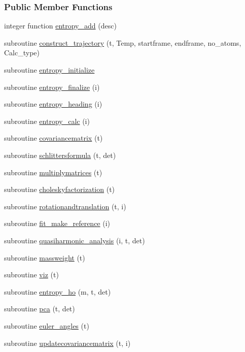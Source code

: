 \subsubsection*{Public Member Functions}
\begin{DoxyCompactItemize}
\item 
integer function \hyperlink{classcalc__entropy_aed82d686b07a9020efcd8f4587376359}{entropy\-\_\-add} (desc)
\item 
subroutine \hyperlink{classcalc__entropy_a2706ab3575d4580b597c79e13eb3bb5d}{construct\-\_\-trajectory} (t, Temp, startframe, endframe, no\-\_\-atoms, Calc\-\_\-type)
\item 
subroutine \hyperlink{classcalc__entropy_a9d1d1405c17e8adf37d4832bc14142c5}{entropy\-\_\-initialize}
\item 
subroutine \hyperlink{classcalc__entropy_a8b7097d5478f130ec2b04ac4eb69e156}{entropy\-\_\-finalize} (i)
\item 
subroutine \hyperlink{classcalc__entropy_a45c5006942f4bd7795537dcafd948a49}{entropy\-\_\-heading} (i)
\item 
subroutine \hyperlink{classcalc__entropy_aa0d5bd96bcbb6587c5e1e624674e5e4e}{entropy\-\_\-calc} (i)
\item 
subroutine \hyperlink{classcalc__entropy_a3755d627dc2eefc79df4b59a4250ed9a}{covariancematrix} (t)
\item 
subroutine \hyperlink{classcalc__entropy_aa6f0af095a3daa755f27611c7ee3a137}{schlittersformula} (t, det)
\item 
subroutine \hyperlink{classcalc__entropy_a1bf295689ab7aa8ba66f5d835758c3ca}{multiplymatrices} (t)
\item 
subroutine \hyperlink{classcalc__entropy_ab9136e2396446b5059a5fe7d36125573}{choleskyfactorization} (t)
\item 
subroutine \hyperlink{classcalc__entropy_ac138d87a9a4edec83f075e4ae4525ef6}{rotationandtranslation} (t, i)
\item 
subroutine \hyperlink{classcalc__entropy_a874a920bba323f41659a5a5b14988c01}{fit\-\_\-make\-\_\-reference} (i)
\item 
subroutine \hyperlink{classcalc__entropy_a2a9d851b8b3e7af4603059175dc539e3}{quasiharmonic\-\_\-analysis} (i, t, det)
\item 
subroutine \hyperlink{classcalc__entropy_aaf7cfa4698786aa90ec49a0534983b2c}{massweight} (t)
\item 
subroutine \hyperlink{classcalc__entropy_ab1305be69ef87d449d6e0a83f557ef80}{viz} (t)
\item 
subroutine \hyperlink{classcalc__entropy_ab614cb6e56be859a584badf06fdbc1fa}{entropy\-\_\-ho} (m, t, det)
\item 
subroutine \hyperlink{classcalc__entropy_afae4ac42e827ba29f7e2dc444a868123}{pca} (t, det)
\item 
subroutine \hyperlink{classcalc__entropy_ae9756fd0464bdb3c038ac5d3388a1847}{euler\-\_\-angles} (t)
\item 
subroutine \hyperlink{classcalc__entropy_abb832ec2f5a651941ccad38b1b20b9be}{updatecovariancematrix} (t, i)
\end{DoxyCompactItemize}
